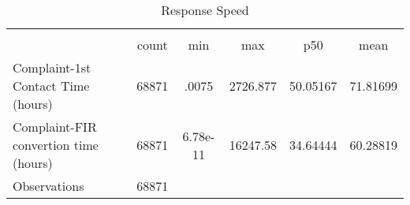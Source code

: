 \begin{table}[htbp]\centering
\def\sym#1{\ifmmode^{#1}\else\(^{#1}\)\fi}
\caption{Response Speed}
\begin{tabular}{l*{1}{ccccc}}
\hline\hline
                    &\multicolumn{5}{c}{}                                            \\
                    &       count&         min&         max&         p50&        mean\\
\hline
Complaint-1st Contact Time (hours)&       68871&       .0075&    2726.877&    50.05167&    71.81699\\
Complaint-FIR convertion time (hours)&       68871&    6.78e-11&    16247.58&    34.64444&    60.28819\\
\hline
Observations        &       68871&            &            &            &            \\
\hline\hline
\end{tabular}
\end{table}
